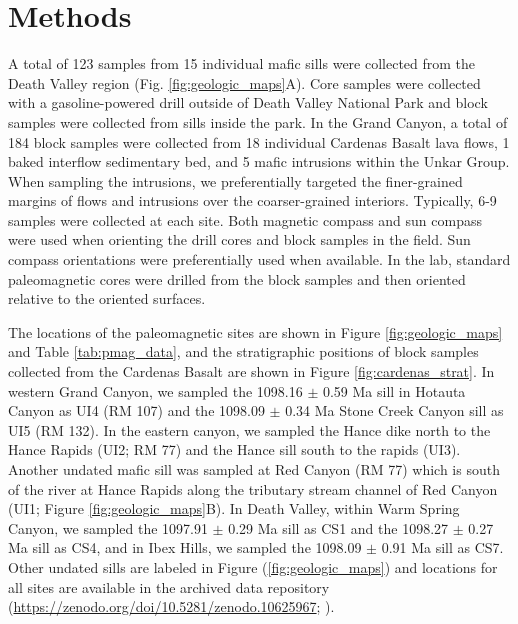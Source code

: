 \section*{Methods}

A total of 123 samples from 15 individual mafic sills were collected from the Death Valley region (Fig. \ref{fig:geologic_maps}A). Core samples were collected with a gasoline-powered drill outside of Death Valley National Park and block samples were collected from sills inside the park. In the Grand Canyon, a total of 184 block samples were collected from 18 individual Cardenas Basalt lava flows, 1 baked interflow sedimentary bed, and 5 mafic intrusions within the Unkar Group. When sampling the intrusions, we preferentially targeted the finer-grained margins of flows and intrusions over the coarser-grained interiors. Typically, 6-9 samples were collected at each site. Both magnetic compass and sun compass were used when orienting the drill cores and block samples in the field. Sun compass orientations were preferentially used when available. In the lab, standard paleomagnetic cores were drilled from the block samples and then oriented relative to the oriented surfaces.

The locations of the paleomagnetic sites are shown in Figure \ref{fig:geologic_maps} and Table \ref{tab:pmag_data}, and the stratigraphic positions of block samples collected from the Cardenas Basalt are shown in Figure \ref{fig:cardenas_strat}. In western Grand Canyon, we sampled the 1098.16 $\pm$ 0.59 Ma sill in Hotauta Canyon as UI4 (RM 107) and the 1098.09 $\pm$ 0.34 Ma Stone Creek Canyon sill as UI5 (RM 132). In the eastern canyon, we sampled the Hance dike north to the Hance Rapids (UI2; RM 77) and the Hance sill south to the rapids (UI3). Another undated mafic sill was sampled at Red Canyon (RM 77) which is south of the river at Hance Rapids along the tributary stream channel of Red Canyon (UI1; Figure \ref{fig:geologic_maps}B). In Death Valley, within Warm Spring Canyon, we sampled the 1097.91 $\pm$ 0.29 Ma sill as CS1 and the 1098.27 $\pm$ 0.27 Ma sill as CS4, and in Ibex Hills, we sampled the 1098.09 $\pm$ 0.91 Ma sill as CS7. Other undated sills are labeled in Figure (\ref{fig:geologic_maps}) and locations for all sites are available in the archived data repository (\url{https://zenodo.org/doi/10.5281/zenodo.10625967}; ). 

